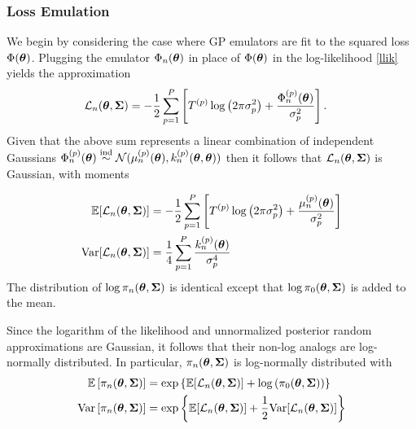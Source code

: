 \documentclass[12pt]{article}
\begin{document}
\subsubsection{Loss Emulation}
We begin by considering the case where GP emulators are fit to the squared loss $\Phi(\boldsymbol{\theta})$.
Plugging the emulator $\Phi_n(\boldsymbol{\theta})$ in place of $\Phi(\boldsymbol{\theta})$ in the log-likelihood
\ref{llik} yields the approximation 
\begin{align*}
\mathcal{L}_{n}(\boldsymbol{\theta}, \boldsymbol{\Sigma}) &= -\frac{1}{2} \sum_{p = 1}^{P} \left[{T}^{(p)} \log\left(2\pi \sigma_{p}^2 \right) + \frac{\Phi_{n}^{(p)}(\boldsymbol{\theta})}{\sigma_{p}^2} \right].
\end{align*}
Given that the above sum represents a linear combination of independent Gaussians 
$\Phi_{n}^{(p)}(\boldsymbol{\theta}) \overset{\text{ind}}{\sim} \mathcal{N}(\mu_{n}^{(p)}(\boldsymbol{\theta}), k_{n}^{(p)}(\boldsymbol{\theta}, \boldsymbol{\theta}))$ then it follows that 
$\mathcal{L}_{n}(\boldsymbol{\theta}, \boldsymbol{\Sigma})$ is Gaussian, with moments 

\begin{align}
\mathbb{E}[\mathcal{L}_{n}(\boldsymbol{\theta}, \boldsymbol{\Sigma})] &= -\frac{1}{2} \sum_{p = 1}^{P} \left[{T}^{(p)} \log\left(2\pi \sigma_{p}^2 \right) + \frac{\mu_{n}^{(p)}(\boldsymbol{\theta})}{\sigma_{p}^2} \right] \label{llik_approx_mean} \\
\mathrm{Var}[\mathcal{L}_{n}(\boldsymbol{\theta}, \boldsymbol{\Sigma})] &= \frac{1}{4} \sum_{p = 1}^{P} \frac{k_{n}^{(p)}(\boldsymbol{\theta})}{\sigma_{p}^4} \label{llik_approx_var}
\end{align}
The distribution of $\log \pi_{n}(\boldsymbol{\theta}, \boldsymbol{\Sigma})$ is identical except that $\log \pi_0(\boldsymbol{\theta}, \boldsymbol{\Sigma})$ is added to the mean. 

Since the logarithm of the likelihood and unnormalized posterior random approximations are Gaussian, it follows that their non-log analogs are log-normally distributed.
In particular, $\pi_{n}(\boldsymbol{\theta}, \boldsymbol{\Sigma})$ is log-normally distributed with 
\begin{align}
\mathbb{E}\left[\pi_{n}(\boldsymbol{\theta}, \boldsymbol{\Sigma})\right] &= \exp\left\{\mathbb{E}[\mathcal{L}_{n}(\boldsymbol{\theta}, \boldsymbol{\Sigma})] + \log\left(\pi_0(\boldsymbol{\theta}, \boldsymbol{\Sigma})\right) \right\} \\
\mathrm{Var}\left[\pi_{n}(\boldsymbol{\theta}, \boldsymbol{\Sigma})\right] &= \exp\left\{\mathbb{E}[\mathcal{L}_{n}(\boldsymbol{\theta}, \boldsymbol{\Sigma})] + \frac{1}{2}\mathrm{Var}[\mathcal{L}_{n}(\boldsymbol{\theta}, \boldsymbol{\Sigma})] \right\} \label{post_approx_var}
\end{align}
\end{document}
